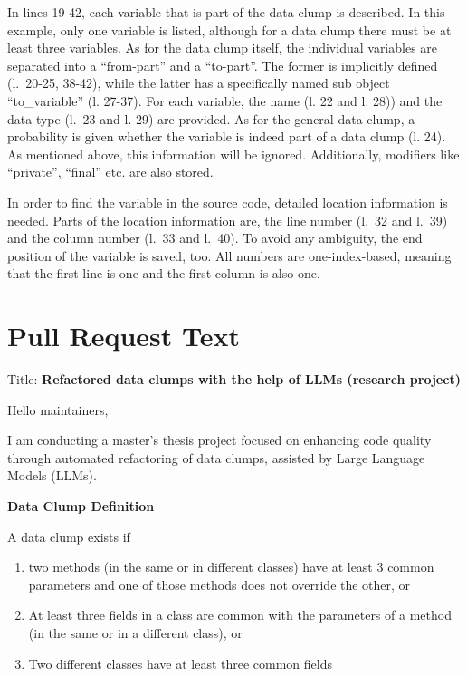 \begin{appendices}
In lines 19-42, each variable that is part of the data clump is described. In this example, only one variable is listed, although for a data clump there must be at least three variables. As for the data clump itself, the individual variables are separated into a \enquote{from-part} and a \enquote{to-part}. The former is implicitly defined (l.~20-25, 38-42), while the latter has a specifically named sub object \enquote{to\_variable} (l. 27-37). For each variable, the name (l. 22 and l. 28)) and the data type (l.~23 and l. 29) are provided. As for the general data clump, a probability is given whether the variable is indeed part of a data clump (l. 24). As mentioned above, this information will be ignored.  Additionally, modifiers like \enquote{private}, \enquote{final} etc. are also stored. 

In order to find the variable in the source code, detailed location information is needed. Parts of the location information are, the line number (l.~32 and l.~39) and the column number (l.~33 and l.~40). To avoid any ambiguity, the end position of the variable is saved, too. All numbers are one-index-based, meaning that the first line is one and the first column is also one. 


\chapter{Pull Request Text} \label{app:pr_text}


Title: \textbf{ Refactored data clumps with the help of LLMs (research project)}


Hello maintainers,

I am conducting a master's thesis project focused on enhancing code quality through automated refactoring of data clumps, assisted by Large Language Models (LLMs).\newline


\textbf{Data Clump Definition}
\newline

A data clump exists if
\begin{enumerate}
    \item  two methods (in the same or in different classes) have at least 3 common parameters and one of those methods does not override the other,  or
    \item  At least three fields in a class are common with the parameters of a method (in the same or in a different class), or
    \item  Two different classes have at least three common fields
\end{enumerate}


\end{appendices}
